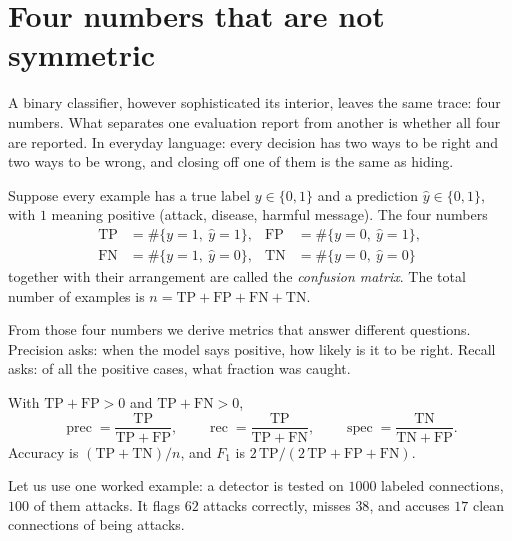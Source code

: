 \section{Four numbers that are not symmetric}

A binary classifier, however sophisticated its interior, leaves the same trace: four numbers. What
separates one evaluation report from another is whether all four are reported. In everyday
language: every decision has two ways to be right and two ways to be wrong, and closing off one of
them is the same as hiding.


\begin{definisi}
Suppose every example has a true label $y\in\{0,1\}$ and a prediction
$\hat y\in\{0,1\}$, with $1$ meaning positive (attack, disease, harmful message).
The four numbers
\begin{align}
\mathrm{TP}&=\#\{y=1,\ \hat y=1\}, & \mathrm{FP}&=\#\{y=0,\ \hat y=1\},
\nonumber\\
\mathrm{FN}&=\#\{y=1,\ \hat y=0\}, & \mathrm{TN}&=\#\{y=0,\ \hat y=0\}
\nonumber
\end{align}
together with their arrangement are called the \emph{confusion matrix}. The total number of
examples is $n=\mathrm{TP}+\mathrm{FP}+\mathrm{FN}+\mathrm{TN}$.
\end{definisi}

From those four numbers we derive metrics that answer different questions. Precision asks: when the
model says positive, how likely is it to be right. Recall asks: of all the positive cases, what
fraction was caught.

\begin{definisi}
With $\mathrm{TP}+\mathrm{FP}>0$ and $\mathrm{TP}+\mathrm{FN}>0$,
\[
\operatorname{prec}=\frac{\mathrm{TP}}{\mathrm{TP}+\mathrm{FP}},\qquad
\operatorname{rec}=\frac{\mathrm{TP}}{\mathrm{TP}+\mathrm{FN}},\qquad
\operatorname{spec}=\frac{\mathrm{TN}}{\mathrm{TN}+\mathrm{FP}} .
\]
Accuracy is $(\mathrm{TP}+\mathrm{TN})/n$, and $F_1$ is
$2\,\mathrm{TP}/(2\,\mathrm{TP}+\mathrm{FP}+\mathrm{FN})$.
\end{definisi}

Let us use one worked example: a detector is tested on $1000$ labeled connections, $100$ of them
attacks. It flags $62$ attacks correctly, misses $38$, and accuses $17$ clean connections of being
attacks.

